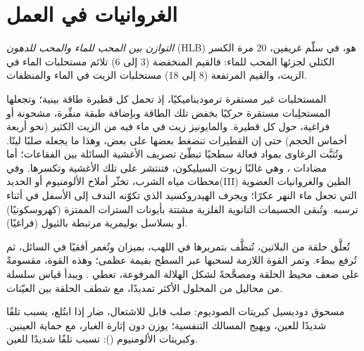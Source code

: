 \section{الغروانيات في العمل}

\begin{definition}\label{def:b3:colloids:hlb}
\emph{التوازن بين المحب للماء والمحب للدهون}
(HLB)  هو، في سلّم غريفين، $20$ مرة الكسر
الكتلي لجزئها المحب للماء: فالقيم المنخفضة (3 إلى 6) تلائم مستحلبات الماء في
الزيت، والقيم المرتفعة (8 إلى 18) مستحلبات الزيت في الماء والمنظفات.
\end{definition}

المستحلبات غير مستقرة ترموديناميكيًا، إذ تحمل كل قطيرة
طاقة بينية؛ وتجعلها المستحلِبات مستقرة حركيًا بخفض تلك
الطاقة وبإضافة طبقة منفِّرة، مشحونة أو فراغية، حول كل قطيرة.
والمايونيز  زيت في ماء فيه من الزيت الكثير (نحو أربعة أخماس
الحجم) حتى إن القطيرات تنضغط بعضها على بعض، وهذا ما يجعله
صلبًا لينًا. وتُثبَّت الرغاوى بمواد فعالة سطحيًا تبطّئ تصريف
الأغشية السائلة بين الفقاعات؛ أما مضادات ، وهي غالبًا زيوت السيليكون، فتنتشر على تلك
الأغشية وتكسرها. وفي محطات مياه الشرب، تخثّر أملاح الألومنيوم أو الحديد(III)
الطين والغروانيات العضوية التي تجعل ماء النهر عكرًا؛ 
ويجرف الهيدروكسيد الذي تكوّنه الندف إلى الأسفل في أثناء ترسبه. وتُبقى الجسيمات
النانوية الفلزية مشتتة بأيونات السترات الممتزة (كهروسكونيًا) أو بسلاسل بوليمرية
مرتبطة بالثيول (فراغيًا).

\begin{inthelab}
تُعلَّق حلقة من البلاتين، تُنظَّف بتمريرها في اللهب، بميزان وتُغمر
أفقيًا في السائل، ثم تُرفع ببطء. وتمر القوة اللازمة لسحبها
عبر السطح بقيمة عظمى؛ وهذه القوة، مقسومةً على ضعف محيط
الحلقة ومصحَّحةً لشكل الهلالة المرفوعة، تعطي
. ويبدأ قياس سلسلة من محاليل  من المحلول الأكثر
تمديدًا، مع شطف الحلقة بين العيّنات.
\end{inthelab}

\begin{safety}{}
مسحوق دوديسيل كبريتات الصوديوم: صلب قابل للاشتعال، ضار إذا ابتُلع، يسبب
تلفًا شديدًا للعين، ويهيج المسالك التنفسية؛ يوزن دون إثارة
الغبار، مع حماية العينين. وكبريتات الألومنيوم (): تسبب تلفًا شديدًا
للعين.
\end{safety}

